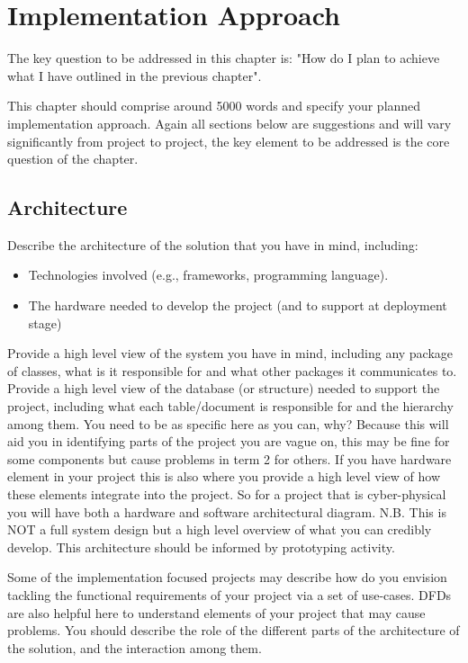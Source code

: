 \chapter{Implementation Approach}
\label{chap:implementation}
The key question to be addressed in this chapter is: "How do I plan to achieve what I have outlined in the previous chapter".

This chapter should comprise around 5000 words and specify your planned implementation approach. Again all sections below are suggestions and will vary significantly from project to project, the key element to be addressed is the core question of the chapter.

\section{Architecture} \label{sec:Arch}
Describe the architecture of the solution that you have in mind, including:
\begin{itemize}
    \item Technologies involved (e.g., frameworks, programming language). 
    \item The hardware needed to develop the project (and to support at deployment stage)
\end{itemize}

Provide a high level view of the system you have in mind, including any package of classes, what is it responsible for and what other packages it communicates to. Provide a high level view of the database (or structure) needed to support the project, including what each table/document is responsible for and the hierarchy among them. You need to be as specific here as you can, why? Because this will aid you in identifying parts of the project you are vague on, this may be fine for some components but cause problems in term 2 for others. If you have hardware element in your project this is also where you provide a high level view of how these elements integrate into the project. So for a project that is cyber-physical you will have both a hardware and software architectural diagram. N.B. This is NOT a full system design but a high level overview of what you can credibly develop. This architecture should be informed by prototyping activity. 

Some of the implementation focused projects may describe how do you envision tackling the functional requirements of your project via a set of use-cases. DFDs are also helpful here to understand elements of your project that may cause problems. You should describe the role of the different parts of the architecture of the solution, and the interaction among them.

